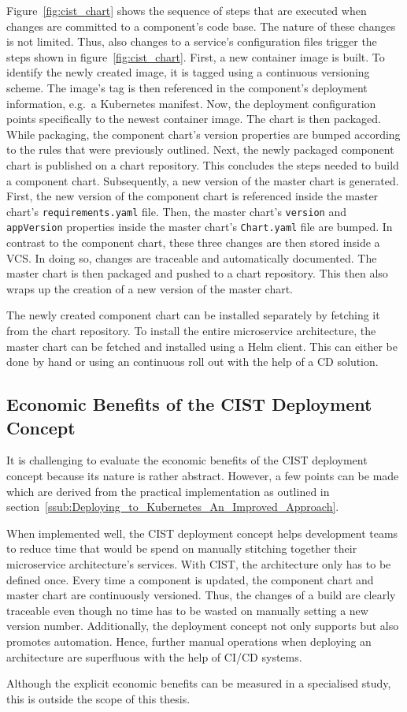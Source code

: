 Figure~\ref{fig:cist_chart} shows the sequence of steps that are executed when
changes are committed to a component's code base. The nature of these changes
is not limited. Thus, also changes to a service's configuration files trigger
the steps shown in figure~\ref{fig:cist_chart}. First, a new container image is
built. To identify the newly created image, it is tagged using a continuous
versioning scheme. The image's tag is then referenced in the component's
deployment information, e.g.\ a Kubernetes manifest. Now, the deployment
configuration points specifically to the newest container image. The chart is
then packaged. While packaging, the component chart's version properties are
bumped according to the rules that were previously outlined. Next, the newly
packaged component chart is published on a chart repository. This concludes the
steps needed to build a component chart. Subsequently, a new version of the
master chart is generated. First, the new version of the component chart is
referenced inside the master chart's \texttt{requirements.yaml} file. Then, the
master chart's \texttt{version} and \texttt{appVersion} properties inside the
master chart's \texttt{Chart.yaml} file are bumped. In contrast to the
component chart, these three changes are then stored inside a \ac{VCS}. In
doing so, changes are traceable and automatically documented. The master chart
is then packaged and pushed to a chart repository. This then also wraps up the
creation of a new version of the master chart.

The newly created component chart can be installed separately by fetching it
from the chart repository. To install the entire microservice architecture, the
master chart can be fetched and installed using a Helm client. This can either
be done by hand or using an continuous roll out with the help of a \ac{CD}
solution.

\subsection{Economic Benefits of the \acf{CIST} Deployment Concept}%
\label{sub:Economic_Benefits_of_the_CIST_Deployment_Concept}

It is challenging to evaluate the economic benefits of the \ac{CIST} deployment
concept because its nature is rather abstract. However, a few points can be
made which are derived from the practical implementation as outlined in
section~\ref{ssub:Deploying_to_Kubernetes_An_Improved_Approach}.

When implemented well, the \ac{CIST} deployment concept helps development teams
to reduce time that would be spend on manually stitching together their
microservice architecture's services. With \ac{CIST}, the architecture only has
to be defined once. Every time a component is updated, the component chart and
master chart are continuously versioned. Thus, the changes of a build are
clearly traceable even though no time has to be wasted on manually setting a
new version number. Additionally, the deployment concept not only supports but
also promotes automation. Hence, further manual operations when deploying an
architecture are superfluous with the help of \ac{CI}/\ac{CD} systems.

Although the explicit economic benefits can be measured in a specialised study,
this is outside the scope of this thesis.
